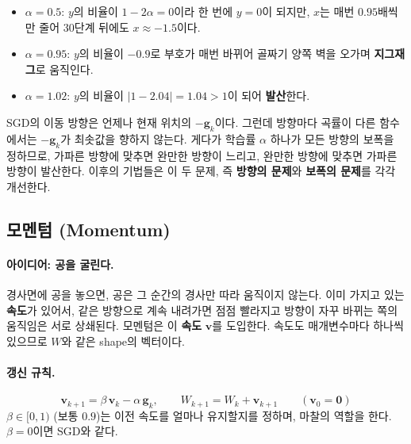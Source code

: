 \documentclass[11pt,a4paper]{article}
\begin{document}
\begin{itemize}[leftmargin=1.8em]
\item $\alpha=0.5$: $y$의 비율이 $1-2\alpha=0$이라 한 번에 $y=0$이 되지만,
$x$는 매번 $0.95$배씩만 줄어 $30$단계 뒤에도 $x\approx-1.5$이다.
\item $\alpha=0.95$: $y$의 비율이 $-0.9$로 부호가 매번 바뀌어 골짜기 양쪽 벽을 오가며 \textbf{지그재그}로 움직인다.
\item $\alpha=1.02$: $y$의 비율이 $|1-2.04|=1.04>1$이 되어 \textbf{발산}한다.
\end{itemize}

\begin{remarkbox}[SGD의 약점]
SGD의 이동 방향은 언제나 현재 위치의 $-\bm g_k$이다.
그런데 방향마다 곡률이 다른 함수에서는 $-\bm g_k$가 최솟값을 향하지 않는다.
게다가 학습률 $\alpha$ 하나가 모든 방향의 보폭을 정하므로,
가파른 방향에 맞추면 완만한 방향이 느리고, 완만한 방향에 맞추면 가파른 방향이 발산한다.
이후의 기법들은 이 두 문제, 즉 \textbf{방향의 문제}와 \textbf{보폭의 문제}를 각각 개선한다.
\end{remarkbox}

\subsection{모멘텀 (Momentum)}\label{sec:momentum}

\paragraph{아이디어: 공을 굴린다.}
경사면에 공을 놓으면, 공은 그 순간의 경사만 따라 움직이지 않는다.
이미 가지고 있는 \textbf{속도}가 있어서, 같은 방향으로 계속 내려가면 점점 빨라지고
방향이 자꾸 바뀌는 쪽의 움직임은 서로 상쇄된다.
모멘텀은 이 \textbf{속도} $\bm v$를 도입한다. 속도도 매개변수마다 하나씩 있으므로 $W$와 같은 shape의 벡터이다.

\paragraph{갱신 규칙.}
\[
\boxed{
\bm v_{k+1}=\beta\,\bm v_k-\alpha\,\bm g_k,
\qquad
W_{k+1}=W_k+\bm v_{k+1}
}
\qquad(\bm v_0=\bm 0)
\]
$\beta\in[0,1)$ (보통 $0.9$)는 이전 속도를 얼마나 유지할지를 정하며, 마찰의 역할을 한다.
$\beta=0$이면 SGD와 같다.
\end{document}
